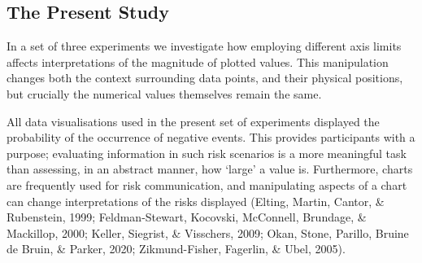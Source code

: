 \documentclass[journal]{vgtc}                %
\begin{document}
\hypertarget{the-present-study}{%
\subsection{The Present Study}\label{the-present-study}}

In a set of three experiments we investigate how employing different axis limits affects interpretations of the magnitude of plotted values. This manipulation changes both the context surrounding data points, and their physical positions, but crucially the numerical values themselves remain the same.

All data visualisations used in the present set of experiments displayed the probability of the occurrence of negative events. This provides participants with a purpose; evaluating information in such risk scenarios is a more meaningful task than assessing, in an abstract manner, how `large' a value is. Furthermore, charts are frequently used for risk communication, and manipulating aspects of a chart can change interpretations of the risks displayed (Elting, Martin, Cantor, \& Rubenstein, 1999; Feldman-Stewart, Kocovski, McConnell, Brundage, \& Mackillop, 2000; Keller, Siegrist, \& Visschers, 2009; Okan, Stone, Parillo, Bruine de Bruin, \& Parker, 2020; Zikmund-Fisher, Fagerlin, \& Ubel, 2005).
\end{document}
